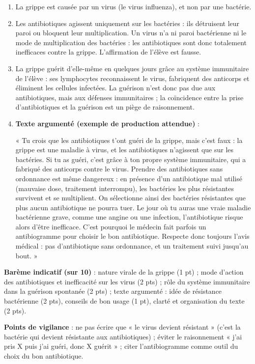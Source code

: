 \documentclass[11pt]{article}
\newcommand{\cle}[1]{{\popxbold\color{popdark}#1}}
\begin{document}
\begin{corrige}
\begin{enumerate}
\item La grippe est causée par un \cle{virus} (le virus influenza), et non par une bactérie.
\item Les antibiotiques agissent uniquement sur les \cle{bactéries} : ils détruisent leur paroi ou bloquent leur multiplication. Un virus n'a ni paroi bactérienne ni le mode de multiplication des bactéries : les antibiotiques sont donc totalement inefficaces contre la grippe. L'affirmation de l'élève est fausse.
\item La grippe guérit d'elle-même en quelques jours grâce au système immunitaire de l'élève : ses lymphocytes reconnaissent le virus, fabriquent des anticorps et éliminent les cellules infectées. La guérison n'est donc pas due aux antibiotiques, mais aux défenses immunitaires ; la coïncidence entre la prise d'antibiotiques et la guérison est un piège de raisonnement.
\item \textbf{Texte argumenté (exemple de production attendue)} :

« Tu crois que les antibiotiques t'ont guéri de la grippe, mais c'est faux : la grippe est une maladie à virus, et les antibiotiques n'agissent que sur les bactéries. Si tu as guéri, c'est grâce à ton propre système immunitaire, qui a fabriqué des anticorps contre le virus. Prendre des antibiotiques sans ordonnance est même dangereux : en présence d'un antibiotique mal utilisé (mauvaise dose, traitement interrompu), les bactéries les plus résistantes survivent et se multiplient. On sélectionne ainsi des \cle{bactéries résistantes} que plus aucun antibiotique ne pourra tuer. Le jour où tu auras une vraie maladie bactérienne grave, comme une angine ou une infection, l'antibiotique risque alors d'être inefficace. C'est pourquoi le médecin fait parfois un antibiogramme pour choisir le bon antibiotique. Respecte donc toujours l'avis médical : pas d'antibiotique sans ordonnance, et un traitement suivi jusqu'au bout. »
\end{enumerate}
\textbf{Barème indicatif (sur 10)} : nature virale de la grippe (1 pt) ; mode d'action des antibiotiques et inefficacité sur les virus (2 pts) ; rôle du système immunitaire dans la guérison spontanée (2 pts) ; texte argumenté : idée de résistance bactérienne (2 pts), conseils de bon usage (1 pt), clarté et organisation du texte (2 pts).

\textbf{Points de vigilance} : ne pas écrire que « le virus devient résistant » (c'est la bactérie qui devient résistante aux antibiotiques) ; éviter le raisonnement « j'ai pris X puis j'ai guéri, donc X guérit » ; citer l'antibiogramme comme outil du choix du bon antibiotique.
\end{corrige}
\end{document}
